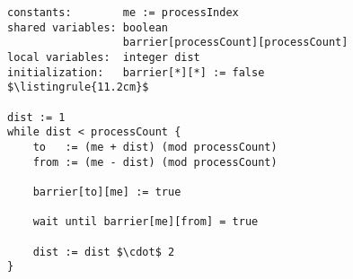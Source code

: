 \begin{center}
\begin{minipage}{\textwidth}
\begin{lstlisting}[mathescape, linewidth=11.2cm]
constants:        me := processIndex
shared variables: boolean
                  barrier[processCount][processCount]
local variables:  integer dist
initialization:   barrier[*][*] := false
$\listingrule{11.2cm}$

dist := 1
while dist < processCount {
	to   := (me + dist) (mod processCount)
	from := (me - dist) (mod processCount)
	
	barrier[to][me] := true
	
	wait until barrier[me][from] = true

	dist := dist $\cdot$ 2
}
\end{lstlisting}
\end{minipage}
\end{center}
